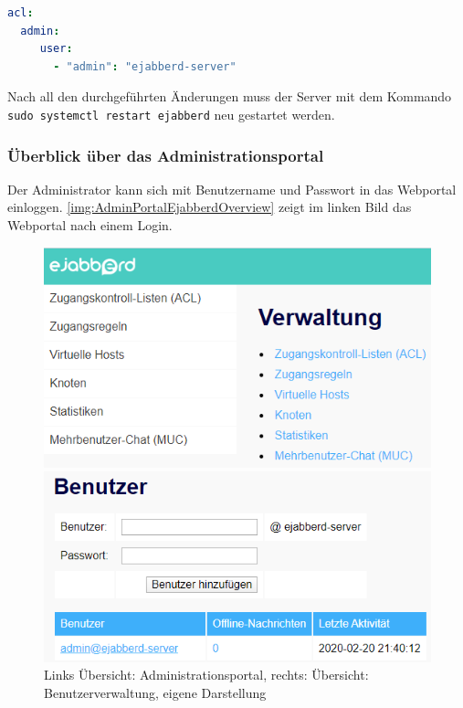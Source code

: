 \documentclass[a4paper,titlepage,halfparskip,12pt]{scrreprt}
\begin{document}
\begin{onehalfspacing}
\bigskip

\begin{lstlisting}[language=yaml, caption={Anpassung der Access Control List (ACL) für den administrativen Zugriff},label={lst:aclChangeAdmin}]
acl:
  admin:
     user:
       - "admin": "ejabberd-server"
\end{lstlisting}


Nach all den durchgeführten Änderungen muss der Server mit dem Kommando \texttt{sudo systemctl restart ejabberd} neu gestartet werden.

\subsubsection*{Überblick über das Administrationsportal}

Der Administrator kann sich mit Benutzername und Passwort in das Webportal einloggen. \autoref{img:AdminPortalEjabberdOverview} zeigt im linken Bild das Webportal nach einem Login.

\begin{figure}[h]
\centering
\begin{minipage}{.5\textwidth}
  \centering
  \includegraphics[width=.9\linewidth]{images/AdminPortalEjabberdOverview}
\end{minipage}%
\begin{minipage}{.5\textwidth}
  \centering
  \includegraphics[width=\linewidth]{images/AdminPortalAddUsers}
\end{minipage}
\caption{Links Übersicht: Administrationsportal, rechts: Übersicht: Benutzerverwaltung, eigene Darstellung}
\label{img:AdminPortalEjabberdOverview}
\end{figure}


\end{onehalfspacing}
\end{document}
